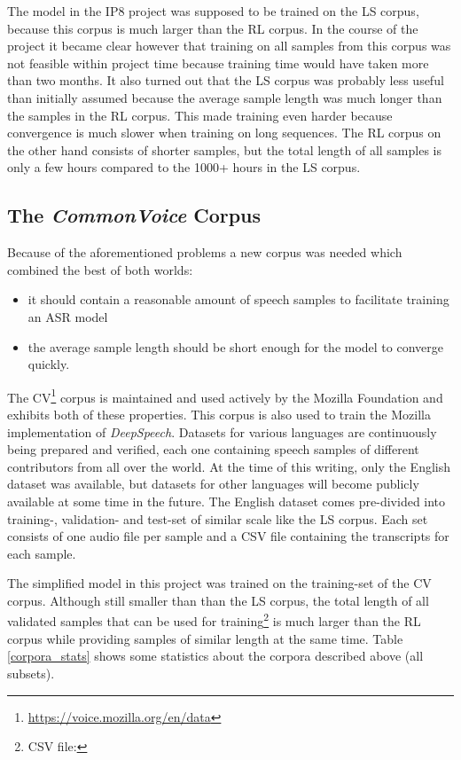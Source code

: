The model in the IP8 project was supposed to be trained on the \ac{LS} corpus, because this corpus is much larger than the \ac{RL} corpus. In the course of the project it became clear however that training on all samples from this corpus was not feasible within project time because training time would have taken more than two months. It also turned out that the \ac{LS} corpus was probably less useful than initially assumed because the average sample length was much longer than the samples in the \ac{RL} corpus. This made training even harder because convergence is much slower when training on long sequences. The \ac{RL} corpus on the other hand consists of shorter samples, but the total length of all samples is only a few hours compared to the 1000+ hours in the \ac{LS} corpus.

\subsection{The \textit{CommonVoice} Corpus}

Because of the aforementioned problems a new corpus was needed which combined the best of both worlds:

\begin{itemize}
	\item it should contain a reasonable amount of speech samples to facilitate training an ASR model
	\item the average sample length should be short enough for the model to converge quickly.
\end{itemize}

The \ac{CV}\footnote{\url{https://voice.mozilla.org/en/data}} corpus is maintained and used actively by the Mozilla Foundation and exhibits both of these properties. This corpus is also used to train the Mozilla implementation of \textit{DeepSpeech}. Datasets for various languages are continuously being prepared and verified, each one containing speech samples of different contributors from all over the world. At the time of this writing, only the English dataset was available, but datasets for other languages will become publicly available at some time in the future. The English dataset comes pre-divided into training-, validation- and test-set of similar scale like the \ac{LS} corpus. Each set consists of one audio file per sample and a CSV file containing the transcripts for each sample.

The simplified model in this project was trained on the training-set of the \ac{CV} corpus. Although still smaller than than the \ac{LS} corpus, the total length of all validated samples that can be used for training\footnote{CSV file: } is much larger than the \ac{RL} corpus while providing samples of similar length at the same time. Table \ref{corpora_stats} shows some statistics about the corpora described above (all subsets).

